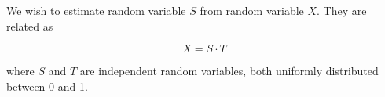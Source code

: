 \begin{solution}
\end{solution}


\else
%
\question[25]  %

We wish to estimate random variable $S$ from random variable $X$. They are related as

$$X = S \cdot T$$

where $S$ and $T$ are independent random variables, both uniformly distributed between 0 and 1.

